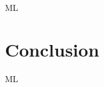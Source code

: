 \documentclass[journal]{IEEEtran}
\begin{document}
ML

\section{Conclusion}

ML




% 










\end{document}
